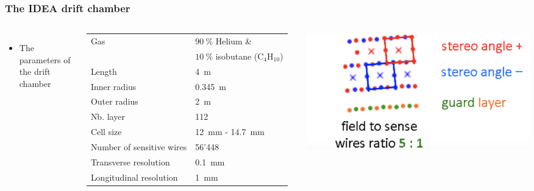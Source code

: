 \documentclass[aspectratio=169, hyperref={colorlinks=true,pdfpagelabels=false,linkcolor=black}, xcolor=dvipsnames,10pt]{beamer}
\begin{document}
\begin{frame}
  \frametitle{The IDEA drift chamber}

  \begin{columns}
    \begin{itemize}
      \item The parameters of the drift chamber \vspace{0.5cm}
    \end{itemize}

    \centering
    \begin{adjustbox}{max width=1\textwidth}
      \begin{tabular}{l l}
        \toprule
          Gas & $90~\%$ Helium \&\\
          & $10~\%$ isobutane ($\text{C}_{4}\text{H}_{10}$) \\
          Length & 4~m \\
          Inner radius & 0.345~m \\
          Outer radius & 2~m\\
          Nb. layer & 112 \\
          Cell size & 12~mm - 14.7~mm \\
          Number of sensitive wires & 56'448 \\
          Transverse resolution & 0.1~mm \\
          Longitudinal resolution & 1~mm \\
        \bottomrule
      \end{tabular}
    \end{adjustbox}

    \centering
    \includegraphics[width=\textwidth]{Figures/Field_sensWires.png}

  \end{columns}


\end{frame}
\end{document}
